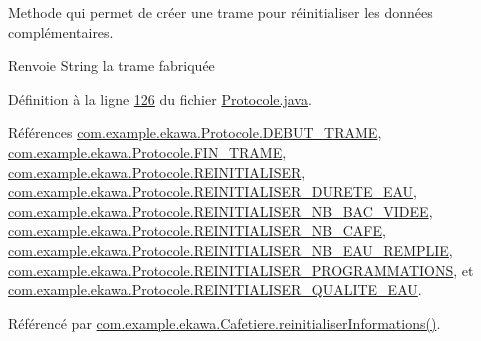 Methode qui permet de créer une trame pour réinitialiser les données complémentaires. 

\begin{DoxyReturn}{Renvoie}
String la trame fabriquée 
\end{DoxyReturn}


Définition à la ligne \hyperlink{_protocole_8java_source_l00126}{126} du fichier \hyperlink{_protocole_8java_source}{Protocole.\+java}.



Références \hyperlink{_protocole_8java_source_l00025}{com.\+example.\+ekawa.\+Protocole.\+D\+E\+B\+U\+T\+\_\+\+T\+R\+A\+ME}, \hyperlink{_protocole_8java_source_l00026}{com.\+example.\+ekawa.\+Protocole.\+F\+I\+N\+\_\+\+T\+R\+A\+ME}, \hyperlink{_protocole_8java_source_l00031}{com.\+example.\+ekawa.\+Protocole.\+R\+E\+I\+N\+I\+T\+I\+A\+L\+I\+S\+ER}, \hyperlink{_protocole_8java_source_l00079}{com.\+example.\+ekawa.\+Protocole.\+R\+E\+I\+N\+I\+T\+I\+A\+L\+I\+S\+E\+R\+\_\+\+D\+U\+R\+E\+T\+E\+\_\+\+E\+AU}, \hyperlink{_protocole_8java_source_l00077}{com.\+example.\+ekawa.\+Protocole.\+R\+E\+I\+N\+I\+T\+I\+A\+L\+I\+S\+E\+R\+\_\+\+N\+B\+\_\+\+B\+A\+C\+\_\+\+V\+I\+D\+EE}, \hyperlink{_protocole_8java_source_l00076}{com.\+example.\+ekawa.\+Protocole.\+R\+E\+I\+N\+I\+T\+I\+A\+L\+I\+S\+E\+R\+\_\+\+N\+B\+\_\+\+C\+A\+FE}, \hyperlink{_protocole_8java_source_l00078}{com.\+example.\+ekawa.\+Protocole.\+R\+E\+I\+N\+I\+T\+I\+A\+L\+I\+S\+E\+R\+\_\+\+N\+B\+\_\+\+E\+A\+U\+\_\+\+R\+E\+M\+P\+L\+IE}, \hyperlink{_protocole_8java_source_l00081}{com.\+example.\+ekawa.\+Protocole.\+R\+E\+I\+N\+I\+T\+I\+A\+L\+I\+S\+E\+R\+\_\+\+P\+R\+O\+G\+R\+A\+M\+M\+A\+T\+I\+O\+NS}, et \hyperlink{_protocole_8java_source_l00080}{com.\+example.\+ekawa.\+Protocole.\+R\+E\+I\+N\+I\+T\+I\+A\+L\+I\+S\+E\+R\+\_\+\+Q\+U\+A\+L\+I\+T\+E\+\_\+\+E\+AU}.



Référencé par \hyperlink{_cafetiere_8java_source_l00683}{com.\+example.\+ekawa.\+Cafetiere.\+reinitialiser\+Informations()}.


